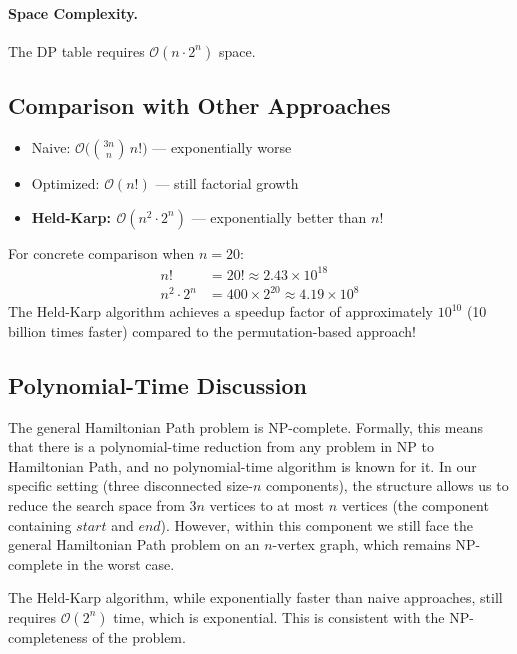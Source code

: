 \documentclass[11pt]{article}
\begin{document}
\paragraph{Space Complexity.} The DP table requires $\mathcal{O}(n \cdot 2^n)$ space.

\subsection*{Comparison with Other Approaches}
\begin{itemize}[left=1.2em]
	\item Naive: $\mathcal{O}\!\big(\binom{3n}{n}\, n!\big)$ --- exponentially worse
	\item Optimized: $\mathcal{O}(n!)$ --- still factorial growth
	\item \textbf{Held-Karp: $\mathcal{O}(n^2 \cdot 2^n)$} --- exponentially better than $n!$
\end{itemize}

For concrete comparison when $n = 20$:
\begin{align*}
n! &= 20! \approx 2.43 \times 10^{18} \\
n^2 \cdot 2^n &= 400 \times 2^{20} \approx 4.19 \times 10^{8}
\end{align*}
The Held-Karp algorithm achieves a speedup factor of approximately $10^{10}$ (10 billion times faster) compared to the permutation-based approach!

\subsection*{Polynomial-Time Discussion}
The general Hamiltonian Path problem is NP-complete. Formally, this means that there is a polynomial-time reduction from any problem in NP to Hamiltonian Path, and no polynomial-time algorithm is known for it. In our specific setting (three disconnected size-$n$ components), the structure allows us to reduce the search space from $3n$ vertices to at most $n$ vertices (the component containing $\textit{start}$ and $\textit{end}$). However, within this component we still face the general Hamiltonian Path problem on an $n$-vertex graph, which remains NP-complete in the worst case.

The Held-Karp algorithm, while exponentially faster than naive approaches, still requires $\mathcal{O}(2^n)$ time, which is exponential. This is consistent with the NP-completeness of the problem.
\end{document}
